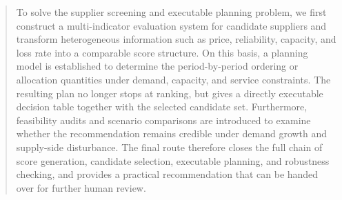 \begin{abstract}
To solve the supplier screening and executable planning problem, we first construct a multi-indicator evaluation system for candidate suppliers and transform heterogeneous information such as price, reliability, capacity, and loss rate into a comparable score structure. On this basis, a planning model is established to determine the period-by-period ordering or allocation quantities under demand, capacity, and service constraints. The resulting plan no longer stops at ranking, but gives a directly executable decision table together with the selected candidate set. Furthermore, feasibility audits and scenario comparisons are introduced to examine whether the recommendation remains credible under demand growth and supply-side disturbance. The final route therefore closes the full chain of score generation, candidate selection, executable planning, and robustness checking, and provides a practical recommendation that can be handed over for further human review.

\end{abstract}
